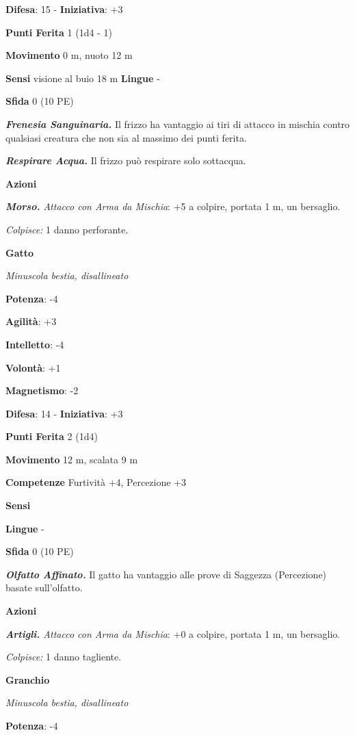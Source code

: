 \begin{multicols}{2}
\textbf{Difesa}: 15 - \textbf{Iniziativa}: +3

\textbf{Punti Ferita} 1 (1d4 - 1)

\textbf{Movimento} 0 m, nuoto 12 m

\textbf{Sensi} visione al buio 18 m
\textbf{Lingue} -

\textbf{Sfida} 0 (10 PE)\smallskip

\emph{\textbf{Frenesia Sanguinaria.}} Il frizzo ha vantaggio ai tiri di
attacco in mischia contro qualsiasi creatura che non sia al massimo dei
punti ferita.

\emph{\textbf{Respirare Acqua.}} Il frizzo può respirare solo sottacqua.

\smallskip\textbf{Azioni}

\emph{\textbf{Morso.} Attacco con Arma da Mischia}: +5 a colpire,
portata 1 m, un bersaglio.

\emph{Colpisce:} 1 danno perforante.

\textbf{Gatto}

\emph{Minuscola bestia, disallineato}

\textbf{Potenza}: -4

\textbf{Agilità}: +3

\textbf{Intelletto}: -4

\textbf{Volontà}: +1

\textbf{Magnetismo}: -2

\textbf{Difesa}: 14 - \textbf{Iniziativa}: +3

\textbf{Punti Ferita} 2 (1d4)

\textbf{Movimento} 12 m, scalata 9 m

\textbf{Competenze} Furtività +4, Percezione +3

\textbf{Sensi} 

\textbf{Lingue} -

\textbf{Sfida} 0 (10 PE)\smallskip

\emph{\textbf{Olfatto Affinato.}} Il gatto ha vantaggio alle prove di
Saggezza (Percezione) basate sull'olfatto.

\smallskip\textbf{Azioni}

\emph{\textbf{Artigli.} Attacco con Arma da Mischia}: +0 a colpire,
portata 1 m, un bersaglio.

\emph{Colpisce:} 1 danno tagliente.

\textbf{Granchio}

\emph{Minuscola bestia, disallineato}

\textbf{Potenza}: -4


\end{multicols}
